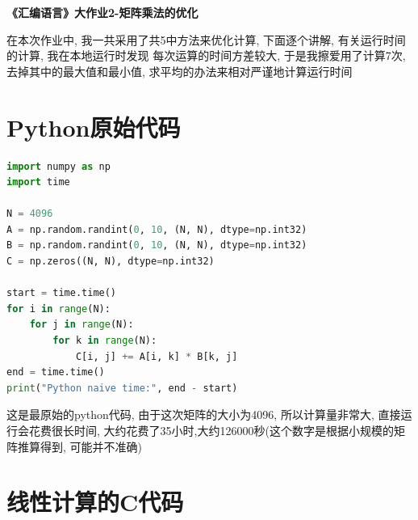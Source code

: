 \documentclass[11pt]{article}
\begin{document}
\fontsize{13pt}{18pt}\selectfont

\pagestyle{fancy}


\begin{center}
\huge{\bf{《汇编语言》大作业2-矩阵乘法的优化}}
\end{center}

在本次作业中, 我一共采用了共5中方法来优化计算, 下面逐个讲解, 有关运行时间的计算, 我在本地运行时发现
每次运算的时间方差较大, 于是我擦爱用了计算7次, 去掉其中的最大值和最小值, 求平均的办法来相对严谨地计算运行时间

\section{Python原始代码}

{\setmainfont{Courier New Bold}                          %
    \begin{lstlisting}[language=Python]
import numpy as np
import time

N = 4096
A = np.random.randint(0, 10, (N, N), dtype=np.int32)
B = np.random.randint(0, 10, (N, N), dtype=np.int32)
C = np.zeros((N, N), dtype=np.int32)

start = time.time()
for i in range(N):
    for j in range(N):
        for k in range(N):
            C[i, j] += A[i, k] * B[k, j]
end = time.time()
print("Python naive time:", end - start)
\end{lstlisting}}
这是最原始的python代码, 由于这次矩阵的大小为4096, 所以计算量非常大, 直接运行会花费很长时间, 大约花费了35小时,大约126000秒(这个数字是根据小规模的矩阵推算得到, 可能并不准确)

\section{线性计算的C代码}
\end{document}
